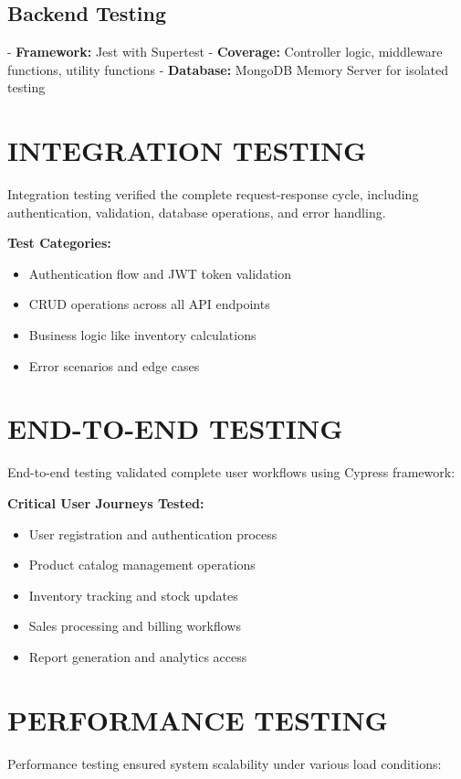 \subsection{Backend Testing}
- \textbf{Framework:} Jest with Supertest
- \textbf{Coverage:} Controller logic, middleware functions, utility functions
- \textbf{Database:} MongoDB Memory Server for isolated testing

\section{INTEGRATION TESTING}

Integration testing verified the complete request-response cycle, including authentication, validation, database operations, and error handling.

\textbf{Test Categories:}
\begin{itemize}
\item Authentication flow and JWT token validation
\item CRUD operations across all API endpoints
\item Business logic like inventory calculations
\item Error scenarios and edge cases
\end{itemize}

\section{END-TO-END TESTING}

End-to-end testing validated complete user workflows using Cypress framework:

\textbf{Critical User Journeys Tested:}
\begin{itemize}
\item User registration and authentication process
\item Product catalog management operations
\item Inventory tracking and stock updates
\item Sales processing and billing workflows
\item Report generation and analytics access
\end{itemize}

\section{PERFORMANCE TESTING}

Performance testing ensured system scalability under various load conditions:

